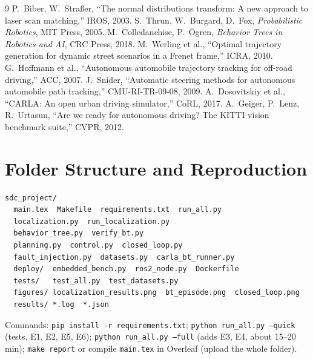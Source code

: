 \documentclass[conference]{IEEEtran}
\begin{document}
\begin{thebibliography}{9}
P.~Biber, W.~Stra{\ss}er, ``The normal distributions transform: A new approach to laser scan matching,'' IROS, 2003.
S.~Thrun, W.~Burgard, D.~Fox, \emph{Probabilistic Robotics}, MIT Press, 2005.
M.~Colledanchise, P.~{\"O}gren, \emph{Behavior Trees in Robotics and AI}, CRC Press, 2018.
M.~Werling et al., ``Optimal trajectory generation for dynamic street scenarios in a Frenet frame,'' ICRA, 2010.
G.~Hoffmann et al., ``Autonomous automobile trajectory tracking for off-road driving,'' ACC, 2007.
J.~Snider, ``Automatic steering methods for autonomous automobile path tracking,'' CMU-RI-TR-09-08, 2009.
A.~Dosovitskiy et al., ``CARLA: An open urban driving simulator,'' CoRL, 2017.
A.~Geiger, P.~Lenz, R.~Urtasun, ``Are we ready for autonomous driving? The KITTI vision benchmark suite,'' CVPR, 2012.
\end{thebibliography}

\clearpage\onecolumn
\appendix
\section{Folder Structure and Reproduction}
\begin{lstlisting}[style=log]
sdc_project/
  main.tex  Makefile  requirements.txt  run_all.py
  localization.py  run_localization.py
  behavior_tree.py  verify_bt.py
  planning.py  control.py  closed_loop.py
  fault_injection.py  datasets.py  carla_bt_runner.py
  deploy/  embedded_bench.py  ros2_node.py  Dockerfile
  tests/   test_all.py  test_datasets.py
  figures/ localization_results.png  bt_episode.png  closed_loop.png
  results/ *.log  *.json
\end{lstlisting}
\noindent Commands: \texttt{pip install -r requirements.txt}; \texttt{python run\_all.py --quick} (tests, E1, E2, E5, E6); \texttt{python run\_all.py --full} (adds E3, E4, about 15--20 min); \texttt{make report} or compile \texttt{main.tex} in Overleaf (upload the whole folder).
\end{document}
